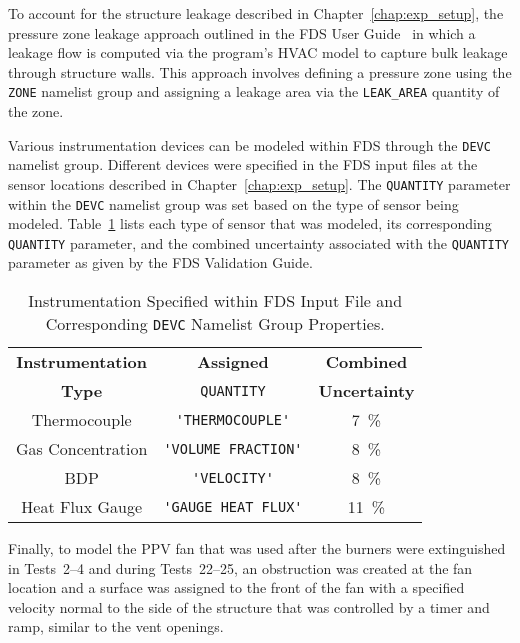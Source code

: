 To account for the structure leakage described in Chapter~\ref{chap:exp_setup}, the pressure zone leakage approach outlined in the FDS User Guide~\cite{FDS_Users_Guide} in which a leakage flow is computed via the program's HVAC model to capture bulk leakage through structure walls. This approach involves defining a pressure zone using the \verb|ZONE| namelist group and assigning a leakage area via the \verb|LEAK_AREA| quantity of the zone.

Various instrumentation devices can be modeled within FDS through the \verb|DEVC| namelist group. Different devices were specified in the FDS input files at the sensor locations described in Chapter~\ref{chap:exp_setup}. The \verb|QUANTITY| parameter within the \verb|DEVC| namelist group was set based on the type of sensor being modeled. Table~\ref{table:FDS_sensor_info} lists each type of sensor that was modeled, its corresponding \verb|QUANTITY| parameter, and the combined uncertainty associated with the \verb|QUANTITY| parameter as given by the FDS Validation Guide.  

\begin{table}[!ht]
\cprotect\caption{Instrumentation Specified within FDS Input File and Corresponding \verb|DEVC| Namelist Group Properties.}
\begin{center}
\begin{tabular}{ccc}
\toprule
\textbf{Instrumentation} & \textbf{Assigned}           & \textbf{Combined}       \\
\textbf{Type}                     & \verb|QUANTITY|             & \textbf{Uncertainty}        \\
\midrule
Thermocouple            & \verb|'THERMOCOUPLE'|       &     7~\%     \\
Gas Concentration       & \verb|'VOLUME FRACTION'|    &     8~\%     \\
BDP                     & \verb|'VELOCITY'|           &     8~\%     \\
Heat Flux Gauge         & \verb|'GAUGE HEAT FLUX'|    &     11~\%     \\
\bottomrule
\end{tabular}
\end{center}
\label{table:FDS_sensor_info}
\end{table}

Finally, to model the PPV fan that was used after the burners were extinguished in Tests~2--4 and during Tests~22--25, an obstruction was created at the fan location and a surface was assigned to the front of the fan with a specified velocity normal to the side of the structure that was controlled by a timer and ramp, similar to the vent openings.  

